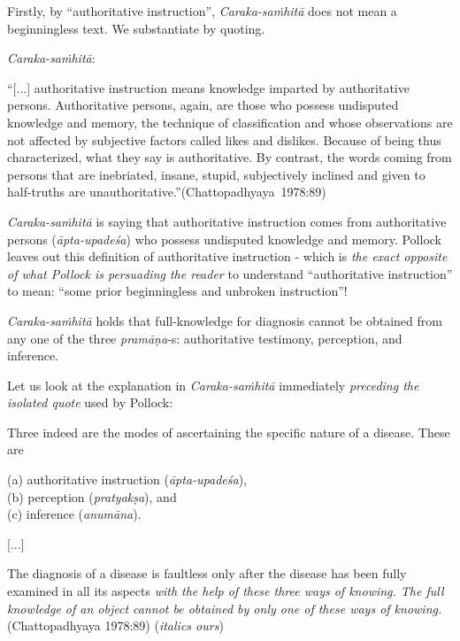Firstly, by ``authoritative instruction'', {{\sl Caraka-saṁhitā}\relax} does not mean a beginningless text. We substantiate by quoting.

{\sl Caraka-saṁhitā}:
\begin{myquote}
``[...] authoritative instruction means knowledge imparted by authoritative persons. Authoritative persons, again, are those who possess undisputed knowledge and memory, the technique of classification and whose observations are not affected by subjective factors called likes and dislikes. Because of being thus characterized, what they say is authoritative.  By contrast, the words coming from persons that are inebriated, insane, stupid, subjectively inclined and given to half-truths are unauthoritative.''\hfill \hbox{(Chattopadhyaya 1978:89)}
\end{myquote}

{\sl Caraka-saṁhitā} is saying that authoritative instruction comes from authoritative persons ({\sl āpta-upadeśa}) who possess undisputed knowledge and memory. Pollock leaves out this definition of authoritative instruction - which is {\sl the exact opposite of what Pollock is persuading the reader} to understand ``authoritative instruction'' to mean: ``some prior beginningless and unbroken instruction''!

{\sl Caraka-saṁhitā} holds that full-knowledge for diagnosis cannot be obtained from any one of the three {\sl pramāṇa}-s: authoritative testimony, perception, and inference.

Let us look at the explanation in {\sl Caraka-saṁhitā} immediately {\sl preceding the isolated quote} used by Pollock:
\begin{myquote}
Three indeed are the modes of ascertaining the specific nature of a disease. These are 

(a) authoritative instruction ({\sl āpta-upadeśa}),\\ 
(b) perception ({\sl pratyakṣa}), and\\ 
(c) inference ({\sl anumāna}).

[...]

The diagnosis of a disease is faultless only after the disease has been fully examined in all its aspects {\sl with the help of these three ways of knowing. The full knowledge of an object cannot be obtained by only one of these ways of knowing.}\hfill (Chattopadhyaya 1978:89) ({\sl italics ours})
\end{myquote}

